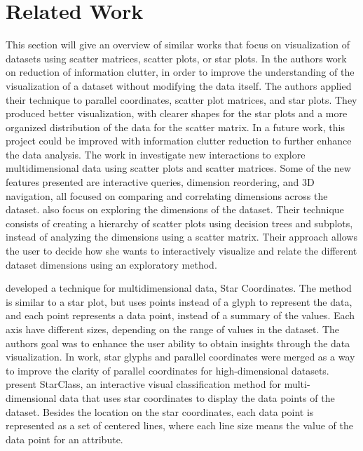 \documentclass[journal]{IEEEtran}
\begin{document}
\section{Related Work}

This section will give an overview of similar works that focus on visualization of datasets using scatter matrices, scatter plots, or star plots. In  \cite{peng2004clutter} the authors work on reduction of information clutter, in order to improve the understanding of the visualization of a dataset without modifying the data itself. The authors applied their technique to parallel coordinates, scatter plot matrices, and star plots. They produced better visualization, with clearer shapes for the star plots and a more organized distribution of the data for the scatter matrix. In a future work, this project could be improved with information clutter reduction to further enhance the data analysis. The work in \cite{elmqvist2008rolling} investigate new interactions to explore multidimensional data using scatter plots and scatter matrices. Some of the new features presented are interactive queries, dimension reordering, and 3D navigation, all focused on comparing and correlating dimensions across the dataset. \cite{eisemann2014nested} also focus on exploring the dimensions of the dataset. Their technique consists of creating a hierarchy of scatter plots using decision trees and subplots, instead of analyzing the dimensions using a scatter matrix. Their approach allows the user to decide how she wants to interactively visualize and relate the different dataset dimensions using an exploratory method.

\cite{kandogan2000star} developed a technique for multidimensional data,  Star Coordinates. The method is similar to a star plot, but uses points instead of a glyph to represent the data, and each point represents a data point, instead of a summary of the values. Each axis have different sizes, depending on the range of values in the dataset. The authors goal was to enhance the user ability to obtain insights through the data visualization. In \cite{fanea2005interactive} work, star glyphs and parallel coordinates were merged as a way to improve the clarity of parallel coordinates for high-dimensional datasets. \cite{teoh2003starclass} present StarClass, an interactive visual classification method for multi-dimensional data that uses star coordinates to display the data points of the dataset. Besides the location on the star coordinates, each data point is represented as a set of centered lines, where each line size means the value of the data point for an attribute.
\end{document}
